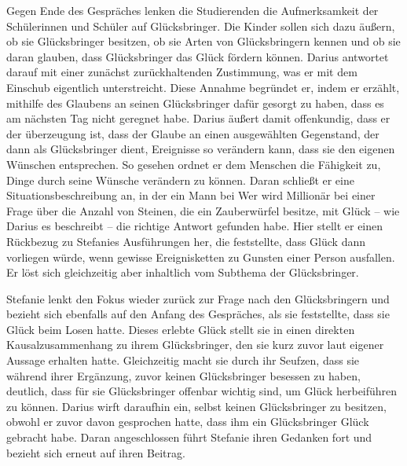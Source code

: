 Gegen Ende des Gespräches lenken die Studierenden die Aufmerksamkeit der Schülerinnen und Schüler auf Glücksbringer. 
Die Kinder sollen sich dazu äußern, ob sie Glücksbringer besitzen, ob sie Arten von Glücksbringern kennen und ob sie daran glauben, dass Glücksbringer das Glück fördern können. 
Darius antwortet darauf mit einer zunächst zurückhaltenden Zustimmung, was er mit dem Einschub \glqq eigentlich\grqq{} unterstreicht. 
Diese Annahme begründet er, indem er erzählt, mithilfe des Glaubens an seinen Glücksbringer dafür gesorgt zu haben, dass es am nächsten Tag nicht geregnet habe. 
Darius äußert damit offenkundig, dass er der überzeugung ist, dass der Glaube an einen ausgewählten Gegenstand, der dann als Glücksbringer dient, Ereignisse so verändern kann, dass sie den eigenen Wünschen entsprechen. 
So gesehen ordnet er dem Menschen die Fähigkeit zu, Dinge durch seine Wünsche verändern zu können. 
Daran schließt er eine Situationsbeschreibung an, in der ein Mann bei \glqq Wer wird Millionär\grqq{} bei einer Frage über die Anzahl von Steinen, die ein Zauberwürfel besitze, mit Glück -- wie Darius es beschreibt -- die richtige Antwort gefunden habe. 
Hier stellt er einen Rückbezug zu Stefanies Ausführungen her, die feststellte, dass Glück dann vorliegen würde, wenn gewisse Ereignisketten zu Gunsten einer Person ausfallen. 
Er löst sich gleichzeitig aber inhaltlich vom Subthema der Glücksbringer.

Stefanie lenkt den Fokus wieder zurück zur Frage nach den Glücksbringern und bezieht sich ebenfalls auf den Anfang des Gespräches, als sie feststellte, dass sie Glück beim Losen hatte. 
Dieses erlebte Glück stellt sie in einen direkten Kausalzusammenhang zu ihrem Glücksbringer, den sie kurz zuvor laut eigener Aussage erhalten hatte. 
Gleichzeitig macht sie durch ihr Seufzen, dass sie während ihrer Ergänzung, zuvor keinen Glücksbringer besessen zu haben, deutlich, dass für sie Glücksbringer offenbar wichtig sind, um Glück herbeiführen zu können. 
Darius wirft daraufhin ein, selbst keinen Glücksbringer zu besitzen, obwohl er zuvor davon gesprochen hatte, dass ihm ein Glücksbringer Glück gebracht habe. 
Daran angeschlossen führt Stefanie ihren Gedanken fort und bezieht sich erneut auf ihren Beitrag.

